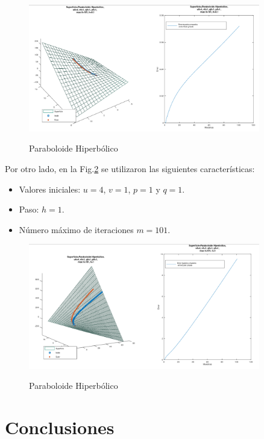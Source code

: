 \documentclass{endm}
\begin{document}
\begin{figure}[H]
\caption{Paraboloide Hiperb\'olico}
\centering
\includegraphics[width=0.9\textwidth]{ph.png}
\label{ph}
\end{figure}


Por otro lado, en la Fig.\ref{phmal} se utilizaron las siguientes caracter\'isticas:
\begin{itemize}
    \item Valores iniciales: $u=4$, $v=1$, $p=1$ y $q=1$.
    \item Paso: $h=1$.
    \item N\'umero m\'aximo de iteraciones $m=101$.
\end{itemize}


\begin{figure}[H]
\caption{Paraboloide Hiperb\'olico}
\centering
\includegraphics[width=0.9\textwidth]{phmal.png}
\label{phmal}
\end{figure}

%
\section{Conclusiones}\label{Conclusiones}
\end{document}
